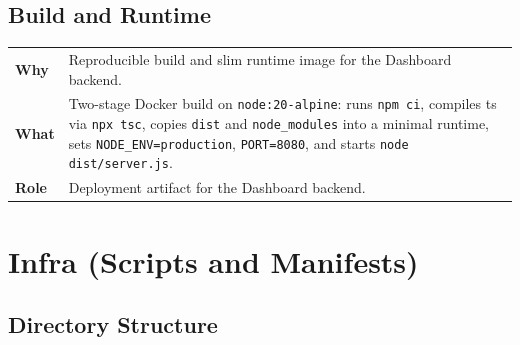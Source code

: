 \documentclass[11pt, a4paper, oneside, listof=totoc]{scrartcl}
\makeatletter
\newcommand{\codesummary}[3]{%
    \vspace{0.4\baselineskip}%
    \noindent\begin{tabularx}{\linewidth}{@{}>{\bfseries}l X@{}}
    Why  & #1\\
    What & #2\\
    Role & #3\\
    \end{tabularx}%
    \vspace{0.2\baselineskip}%
}
\makeatother
\begin{document}
            \subsection{Build and Runtime}
                \codesummary
                    {Reproducible build and slim runtime image for the Dashboard backend.}
                    {Two-stage Docker build on \texttt{node:20-alpine}: runs \texttt{npm ci}, compiles \gls{ts} via \texttt{npx tsc}, copies \texttt{dist} and \texttt{node\_modules} into a minimal runtime, sets \texttt{NODE\_ENV=production}, \texttt{PORT=8080}, and starts \texttt{node dist/server.js}.}
                    {Deployment artifact for the Dashboard backend.}
        
        \clearpage

        \section{Infra (Scripts and Manifests)}\label{app:infra}
            \subsection{Directory Structure}
                \begin{flushleft}
                    \label{fig:infra-tree}
                \end{flushleft}

        \clearpage
\end{document}
